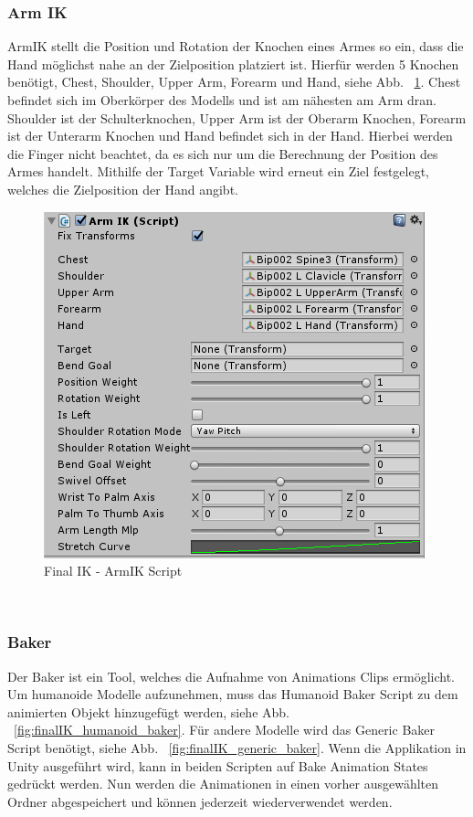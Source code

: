 \begin{itemize}
\subsubsection{Arm IK}
ArmIK stellt die Position und Rotation der Knochen eines Armes so ein, dass die Hand möglichst nahe an der Zielposition platziert ist.
Hierfür werden 5 Knochen benötigt, Chest, Shoulder, Upper Arm, Forearm und Hand, siehe Abb. ~\ref{fig:finalIK_armIK_script}.
Chest befindet sich im Oberkörper des Modells und ist am nähesten am Arm dran.
Shoulder ist der Schulterknochen, Upper Arm ist der Oberarm Knochen, Forearm ist der Unterarm Knochen und Hand befindet sich in der Hand.
Hierbei werden die Finger nicht beachtet, da es sich nur um die Berechnung der Position des Armes handelt.
Mithilfe der Target Variable wird erneut ein Ziel festgelegt, welches die Zielposition der Hand angibt.
\begin {figure}
    \centering
    \includegraphics[scale=1]{pics/finalik_armik_script}
    \caption{Final IK - ArmIK Script}
    \label{fig:finalIK_armIK_script}
\end {figure}
~\cite{FinalIK_ArmIK_2021}

\subsubsection{Baker}
Der Baker ist ein Tool, welches die Aufnahme von Animations Clips ermöglicht.
Um humanoide Modelle aufzunehmen, muss das Humanoid Baker Script zu dem animierten Objekt hinzugefügt werden, siehe Abb. ~\ref{fig:finalIK_humanoid_baker}.
Für andere Modelle wird das Generic Baker Script benötigt, siehe Abb. ~\ref{fig:finalIK_generic_baker}.
Wenn die Applikation in Unity ausgeführt wird, kann in beiden Scripten auf Bake Animation States gedrückt werden.
Nun werden die Animationen in einen vorher ausgewählten Ordner abgespeichert und können jederzeit wiederverwendet werden.


\end{itemize}
